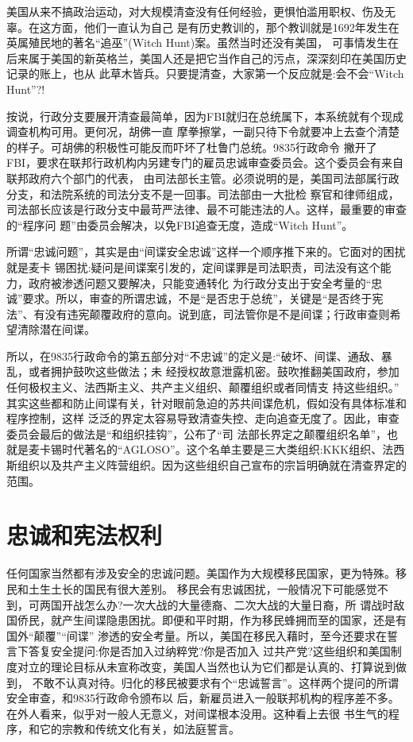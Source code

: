 \documentclass[10pt]{article}
\begin{document}
{美国从来不搞政治运动，对大规模清查没有任何经验，更惧怕滥用职权、伤及无辜。在这方面，他们一直认为自己
是有历史教训的，那个教训就是1692年发生在英属殖民地的著名``追巫''(Witch Hunt)案。虽然当时还没有美国，
可事情发生在后来属于美国的新英格兰，美国人还是把它当作自己的污点，深深刻印在美国历史记录的账上，也从
此草木皆兵。只要提清查，大家第一个反应就是:会不会``Witch Hunt''?!

按说，行政分支要展开清查最简单，因为FBI就归在总统属下，本系统就有个现成调查机构可用。更何况，胡佛一直
摩拳擦掌，一副只待下令就要冲上去查个清楚的样子。可胡佛的积极性可能反而吓坏了杜鲁门总统。9835行政命令
撇开了FBI，要求在联邦行政机构内另建专门的雇员忠诚审查委员会。这个委员会有来自联邦政府六个部门的代表，
由司法部长主管。必须说明的是，美国司法部属行政分支，和法院系统的司法分支不是一回事。司法部由一大批检
察官和律师组成，司法部长应该是行政分支中最苛严法律、最不可能违法的人。这样，最重要的审查的``程序问
题''由委员会解决，以免FBI追查无度，造成``Witch Hunt''。

所谓``忠诚问题''，其实是由``间谍\myrule 安全\myrule 忠诚''这样一个顺序推下来的。它面对的困扰就是麦卡
锡困扰:疑问是间谍案引发的，定间谍罪是司法职责，司法没有这个能力，政府被渗透问题又要解决，只能变通转化
为行政分支出于安全考量的``忠诚''要求。所以，审查的所谓忠诚，不是``是否忠于总统''，关键是``是否终于宪
法''、有没有违宪颠覆政府的意向。说到底，司法管你是不是间谍；行政审查则希望清除潜在间谍。

所以，在9835行政命令的第五部分对``不忠诚''的定义是:``破坏、间谍、通敌、暴乱，或者拥护鼓吹这些做法；未
经授权故意泄露机密。鼓吹推翻美国政府，参加任何极权主义、法西斯主义、共产主义组织、颠覆组织或者同情支
持这些组织。'' 其实这些都和防止间谍有关，针对眼前急迫的苏共间谍危机，假如没有具体标准和程序控制，这样
泛泛的界定太容易导致清查失控、走向追查无度了。因此，审查委员会最后的做法是``和组织挂钩''，公布了``司
法部长界定之颠覆组织名单''，也就是麦卡锡时代著名的``AGLOSO''。这个名单主要是三大类组织:KKK组织、法西
斯组织以及共产主义阵营组织。因为这些组织自己宣布的宗旨明确就在清查界定的范围。

\pagebreak
\section{忠诚和宪法权利}

任何国家当然都有涉及安全的忠诚问题。美国作为大规模移民国家，更为特殊。移民和土生土长的国民有很大差别。
移民会有忠诚困扰，一般情况下可能感觉不到，可两国开战怎么办?一次大战的大量德裔、二次大战的大量日裔，所
谓战时敌国侨民，就产生间谍隐患困扰。即便和平时期，作为移民蜂拥而至的国家，还是有国外``颠覆''``间谍''
渗透的安全考量。所以，美国在移民入藉时，至今还要求在誓言下答复安全提问:你是否加入过纳粹党?你是否加入
过共产党?这些组织和美国制度对立的理论目标从未宣称改变，美国人当然也认为它们都是认真的、打算说到做到，
不敢不认真对待。归化的移民被要求有个``忠诚誓言''。这样两个提问的所谓安全审查，和9835行政命令颁布以
后，新雇员进入一般联邦机构的程序差不多。在外人看来，似乎对一般人无意义，对间谍根本没用。这种看上去很
书生气的程序，和它的宗教和传统文化有关，如法庭誓言。

}
\end{document}
